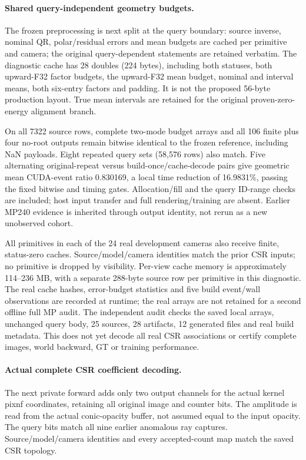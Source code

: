 \documentclass[11pt,a4paper]{article}
\begin{document}
\paragraph{Shared query-independent geometry budgets.}
The frozen preprocessing is next split at the query boundary: source
inverse, nominal QR, polar/residual errors and mean budgets are cached per
primitive and camera; the original query-dependent statements are retained
verbatim. The diagnostic cache has 28 doubles (224 bytes), including both
statuses, both upward-F32 factor budgets, the upward-F32 mean budget,
nominal and interval means, both six-entry factors and padding. It is not
the proposed 56-byte production layout. True mean intervals are retained
for the original proven-zero-energy alignment branch.

On all 7322 source rows, complete two-mode budget arrays and all 106 finite
plus four no-root outputs remain bitwise identical to the frozen reference,
including NaN payloads. Eight repeated query sets (58,576 rows) also match.
Five alternating original-repeat versus build-once/cache-decode pairs give
geometric mean CUDA-event ratio 0.830169, a local time reduction of
16.9831\%, passing the fixed bitwise and timing gates. Allocation/fill and
the query ID-range checks are included; host input transfer and full
rendering/training are absent. Earlier MP240 evidence is inherited through
output identity, not rerun as a new unobserved cohort.

All primitives in each of the 24 real development cameras also receive
finite, status-zero caches. Source/model/camera identities match the prior
CSR inputs; no primitive is dropped by visibility. Per-view cache memory
is approximately 114--236 MB, with a separate 288-byte source row per
primitive in this diagnostic. The real cache hashes, error-budget
statistics and five build event/wall observations are recorded at runtime;
the real arrays are not retained for a second offline full MP audit.
The independent audit checks the saved local arrays, unchanged query
body, 25 sources, 28 artifacts, 12 generated files and real build metadata.
This does not yet decode all real CSR associations or certify complete
images, world backward, GT or training performance.

\paragraph{Actual complete CSR coefficient decoding.}
The next private forward adds only two output channels for the actual
kernel pixnf coordinates, retaining all original image and counter bits.
The amplitude is read from the actual conic-opacity buffer, not assumed
equal to the input opacity. The query bits match all nine earlier anomalous
ray captures. Source/model/camera identities and every accepted-count map
match the saved CSR topology.
\end{document}
